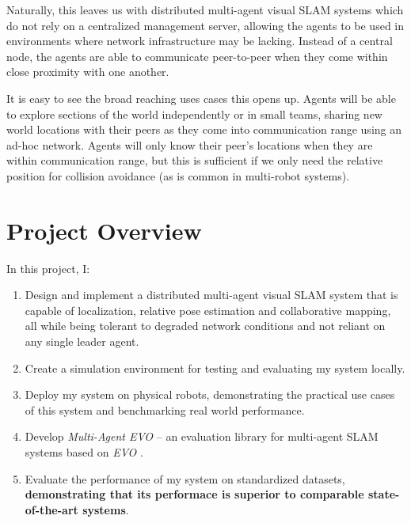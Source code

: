 Naturally, this leaves us with distributed multi-agent visual SLAM systems which do not rely on a centralized management server, allowing the agents to be used in environments where network infrastructure may be lacking. Instead of a central node, the agents are able to communicate peer-to-peer when they come within close proximity with one another.

It is easy to see the broad reaching uses cases this opens up. Agents will be able to explore sections of the world independently or in small teams, sharing new world locations with their peers as they come into communication range using an ad-hoc network. Agents will only know their peer's locations when they are within communication range, but this is sufficient if we only need the relative position for collision avoidance (as is common in multi-robot systems).

\section{Project Overview}
\label{sec:project-overview}
In this project, I: \noparskip
{
    \begin{enumerate}
        \item Design and implement a distributed multi-agent visual SLAM system that is capable of localization, relative pose estimation and  collaborative mapping, all while being tolerant to degraded network conditions and not reliant on any single leader agent.
        \item Create a simulation environment for testing and evaluating my system locally.
        \item Deploy my system on physical robots, demonstrating the practical use cases of this system and benchmarking real world performance.
        \item Develop \textit{Multi-Agent EVO} – an evaluation library for multi-agent SLAM systems based on \textit{EVO} \autocite{grupp2017evo}.
        \item Evaluate the performance of my system on standardized datasets, \textbf{demonstrating that its performace is superior to comparable state-of-the-art systems}.
    \end{enumerate}
}

